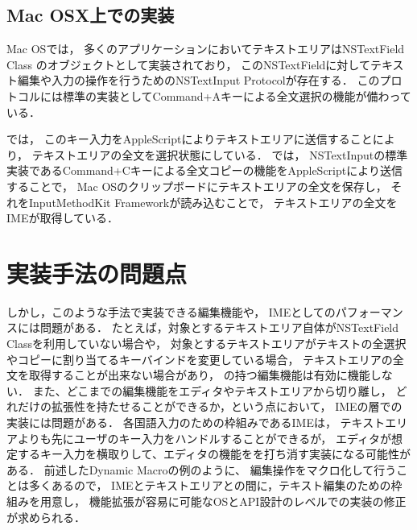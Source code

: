 \subsection{Mac OSX上での実装}

Mac OSでは，
多くのアプリケーションにおいてテキストエリアはNSTextField Class のオブジェクトとして実装されており，
このNSTextFieldに対してテキスト編集や入力の操作を行うためのNSTextInput Protocolが存在する．
このプロトコルには標準の実装としてCommand+Aキーによる全文選択の機能が備わっている．

{\system}では，
このキー入力をAppleScriptによりテキストエリアに送信することにより，
テキストエリアの全文を選択状態にしている．
%
{\system}では，
NSTextInputの標準実装であるCommand+Cキーによる全文コピーの機能をAppleScriptにより送信することで，
Mac OSのクリップボードにテキストエリアの全文を保存し，
それをInputMethodKit Frameworkが読み込むことで，
テキストエリアの全文をIMEが取得している．
%

\section{実装手法の問題点}

しかし，このような手法で実装できる編集機能や，
IMEとしてのパフォーマンスには問題がある．
たとえば，対象とするテキストエリア自体がNSTextField Classを利用していない場合や，
対象とするテキストエリアがテキストの全選択やコピーに割り当てるキーバインドを変更している場合，
テキストエリアの全文を取得することが出来ない場合があり，
{\system}の持つ編集機能は有効に機能しない．
%
また、どこまでの編集機能をエディタやテキストエリアから切り離し，
どれだけの拡張性を持たせることができるか，という点において，
IMEの層での実装には問題がある．
各国語入力のための枠組みであるIMEは，
テキストエリアよりも先にユーザのキー入力をハンドルすることができるが，
エディタが想定するキー入力を横取りして、エディタの機能をを打ち消す実装になる可能性がある．
%
前述したDynamic Macroの例のように、
編集操作をマクロ化して行うことは多くあるので，
IMEとテキストエリアとの間に，テキスト編集のための枠組みを用意し，
機能拡張が容易に可能なOSとAPI設計のレベルでの実装の修正が求められる．

